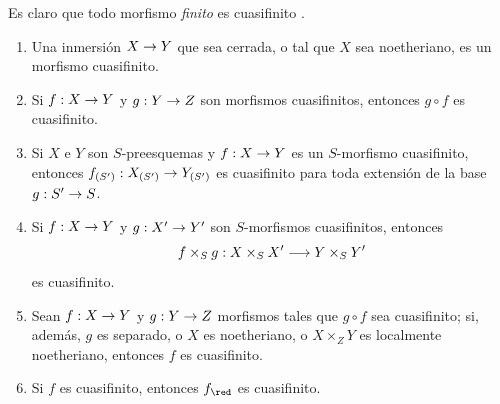 \documentclass[oneside,10pt]{amsart}
\makeatletter
\newcommand{\ega@arrow}[2]{\mathchoice{#1}{#2}{#2}{#2}}
\renewcommand{\to}{\ega@arrow{\longrightarrow}{\rightarrow}}
\let\EGAOriginalLabel\label
\renewcommand{\label}[1]{\phantomsection\EGAOriginalLabel{#1}}
\makeatother
\begin{document}
Es claro que todo morfismo \emph{finito} es cuasifinito .

\begin{proposition}[6.2.4]
\label{II.6.2.4}
\medskip\noindent
\begin{enumerate}
  \item[{\rm(i)}] Una inmersión $X\to Y$ que sea cerrada, o tal que $X$ sea noetheriano, es un morfismo cuasifinito.
  \item[{\rm(ii)}] Si $f:X\to Y$ y $g:Y\to Z$ son morfismos cuasifinitos, entonces $g\circ f$ es cuasifinito.
  \item[{\rm(iii)}] Si $X$ e $Y$ son $S$-preesquemas y $f:X\to Y$ es un $S$-morfismo cuasifinito, entonces $f_{(S')}:X_{(S')}\to Y_{(S')}$ es cuasifinito para toda extensión de la base $g:S'\to S$.
  \item[{\rm(iv)}] Si $f:X\to Y$ y $g:X'\to Y'$ son $S$-morfismos cuasifinitos, entonces
    \[
      f\times_S g : X\times_S X' \to Y\times_S Y'
    \]
    es cuasifinito.
  \item[{\rm(v)}] Sean $f:X\to Y$ y $g:Y\to Z$ morfismos tales que $g\circ f$ sea cuasifinito; si, además, $g$ es separado, o $X$ es noetheriano, o $X\times_Z Y$ es localmente noetheriano, entonces $f$ es cuasifinito.
  \item[{\rm(vi)}] Si $f$ es cuasifinito, entonces $f_\red$ es cuasifinito.
\end{enumerate}
\end{proposition}
\end{document}
